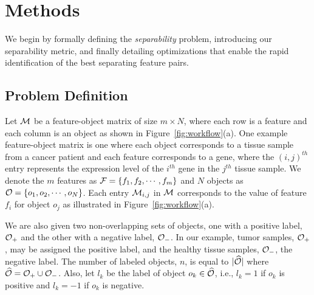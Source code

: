 \section{Methods}
\label{sec:method}
We begin by formally defining the {\em separability} problem,
introducing our separability metric,
and finally detailing optimizations that enable
the rapid identification of the best separating feature pairs.

\subsection{Problem Definition}\label{sec:prob}


Let ${\mathcal{M}}$ be a feature-object matrix of size $m\times N$,
where each row is a feature and each column is an
object as shown in Figure~\ref{fig:workflow}(a).
One example feature-object matrix is one where
each object corresponds to a tissue sample
from a cancer patient and each feature corresponds to a gene,
where the $(i,j)^{th}$ entry represents the
expression level of the $i^{th}$ gene in the $j^{th}$
tissue sample.
We denote the $m$ features as ${\mathcal{F}}=\{f_1,f_2,\cdots,f_m\}$
and $N$ objects as ${\mathcal{O}}=\{o_1,o_2,\cdots,o_N\}$.
Each entry ${\mathcal{M}}_{i,j}$ in ${\mathcal{M}}$ corresponds
to the value of feature $f_i$ for object $o_j$ as illustrated in Figure~\ref{fig:workflow}(a).

We are also given two non-overlapping sets of objects,
one with a positive label, ${\mathcal{O}}_+$ and the other with a negative label, ${\mathcal{O}}_-$.
In our example, tumor samples, ${\mathcal{O}}_+$,
may be assigned the positive label,
and the healthy tissue samples, ${\mathcal{O}}_-$,
the negative label.
The number of labeled objects, $n$, is equal to $|\widehat{{\mathcal{O}}}|$ where $\widehat{{\mathcal{O}}}={\mathcal{O}}_+\cup {\mathcal{O}}_-$.  Also, let $l_k$ be the label of object $o_k\in \widehat{{\mathcal{O}}}$, i.e., $l_k=1$ if $o_k$ is positive and $l_k=-1$ if $o_k$ is negative.

